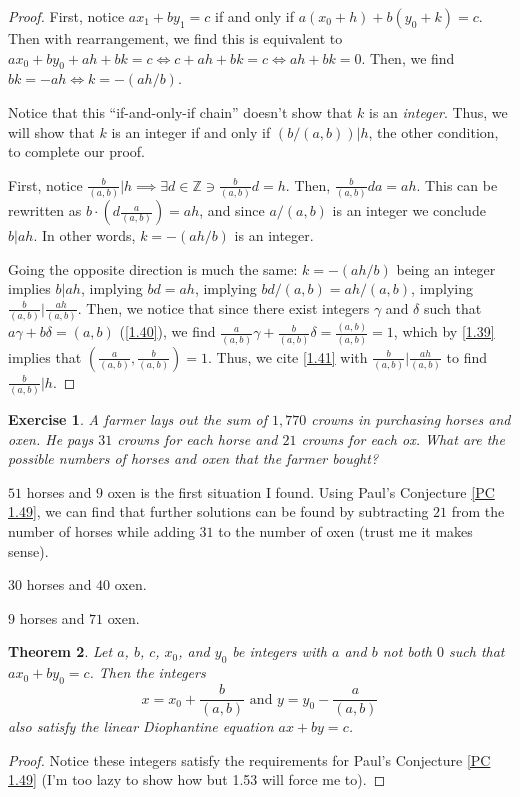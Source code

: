 \documentclass{article}
\newtheorem{thm}{Theorem}[section]
\newtheorem{ex}[thm]{Exercise}
\numberwithin{equation}{thm}
\begin{document}
\begin{proof}
  First, notice $ax_1 + by_1 = c$ if and only if $a(x_0 + h) + b(y_0 + k) = c$. Then with rearrangement, we find this is equivalent to $ax_0 + by_0 + ah + bk = c \iff c + ah + bk = c \iff ah + bk = 0$. Then, we find $bk = -ah \iff k = -(ah/b)$.

  Notice that this ``if-and-only-if chain'' doesn't show that $k$ is an \emph{integer}. Thus, we will show that $k$ is an integer if and only if $(b / (a, b)) | h$, the other condition, to complete our proof.

  First, notice $\frac{b}{(a,b)} | h \implies \exists d \in \mathbb{Z} \ni \frac{b}{(a, b)} d = h$. Then, $\frac{b}{(a, b)} da = ah$. This can be rewritten as $b \cdot (d \frac{a}{(a,b)}) = ah$, and since $a / (a,b)$ is an integer we conclude $b | ah$. In other words, $k = - (ah / b)$ is an integer.

  Going the opposite direction is much the same: $k = - (ah / b)$ being an integer implies $b | ah$, implying $bd = ah$, implying $bd / (a, b) = ah / (a, b)$, implying $\frac{b}{(a,b)} | \frac{ah}{(a,b)}$.
  Then, we notice that since there exist integers $\gamma$ and $\delta$ such that $a\gamma + b\delta = (a,b)$ (\ref{1.40}), we find $\frac{a}{(a,b)} \gamma + \frac{b}{(a,b)} \delta = \frac{(a,b)}{(a,b)} = 1$, which by \ref{1.39} implies that $(\frac{a}{(a,b)}, \frac{b}{(a,b)}) = 1$.
  Thus, we cite \ref{1.41} with $\frac{b}{(a,b)} | \frac{ah}{(a,b)}$ to find $\frac{b}{(a,b)} | h$.
\end{proof}



\begin{ex} \label{1.50}
  A farmer lays out the sum of $1,770$ crowns in purchasing horses and oxen. He pays $31$ crowns for each horse and $21$ crowns for each ox. What are the possible numbers of horses and oxen that the farmer bought?
\end{ex}

$51$ horses and $9$ oxen is the first situation I found. Using Paul's Conjecture \ref{PC 1.49}, we can find that further solutions can be found by subtracting $21$ from the number of horses while adding $31$ to the number of oxen (trust me it makes sense).

$30$ horses and $40$ oxen.

$9$ horses and $71$ oxen.



\begin{thm} \label{1.51}
  Let $a$, $b$, $c$, $x_0$, and $y_0$ be integers with $a$ and $b$ not both $0$ such that $ax_0 + by_0 = c$. Then the integers
  $$x = x_0 + \frac{b}{(a, b)} \mbox{ and } y = y_0 - \frac{a}{(a,b)}$$
  also satisfy the linear Diophantine equation $ax + by = c$.
\end{thm}

\begin{proof}
  Notice these integers satisfy the requirements for Paul's Conjecture \ref{PC 1.49} (I'm too lazy to show how but 1.53 will force me to).
\end{proof}
\end{document}
